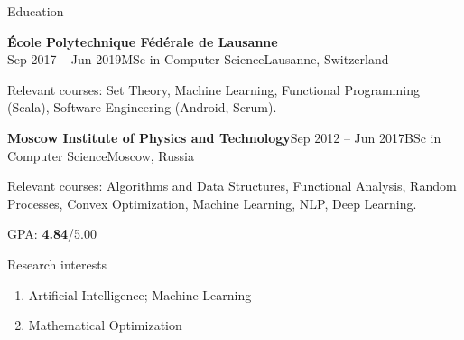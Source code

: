 \documentclass{resume} %
\begin{document}
\begin{rSection}{Education}
\begin{rSubsection}{\bf \'Ecole Polytechnique F\'ed\'erale de Lausanne}{\\Sep 2017 -- Jun 2019}{MSc in Computer Science}{Lausanne, Switzerland}
\item Relevant courses: Set Theory, Machine Learning, Functional Programming (Scala), Software Engineering (Android, Scrum).
\end{rSubsection}

\begin{rSubsection}{\bf Moscow Institute of Physics and Technology}{Sep 2012 -- Jun 2017}{BSc in Computer Science}{Moscow, Russia}
\item Relevant courses: Algorithms and Data Structures, Functional Analysis, Random Processes, Convex Optimization, Machine Learning, NLP, Deep Learning.
\item GPA: {\bf 4.84}/5.00
\end{rSubsection}
\end{rSection}

\begin{rSection}{Research interests}
\begin{enumerate}
\item Artificial Intelligence; Machine Learning
\item Mathematical Optimization
\end{enumerate}
\end{rSection}
\end{document}
